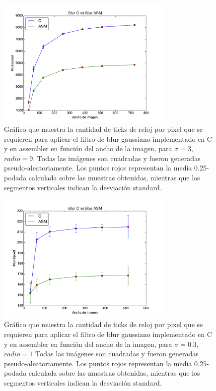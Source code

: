 \begin{figure}[H]
 	\centering
 	\includegraphics[width=0.75\textwidth]{../graficos/blur_v2_lineplot_3-9.pdf}
	\caption{\footnotesize Gráfico que muestra la cantidad de ticks de reloj por pixel que se requieren para aplicar el filtro de blur gaussiano implementado en C y en assembler en función del ancho de la imagen, para $\sigma = 3$, $radio = 9$. Todas las imágenes son cuadradas y fueron generadas pseudo-aleatoriamente. Los puntos rojos representan la media 0.25-podada calculada sobre las muestras obtenidas, mientras que los segmentos verticales indican la desviación standard.}
	\label{fig:exp-blur1}
\end{figure}

\begin{figure}[H]
 	\centering
 	\includegraphics[width=0.75\textwidth]{../graficos/blur_v2_lineplot_03-1.pdf}
	\caption{\footnotesize Gráfico que muestra la cantidad de ticks de reloj por pixel que se requieren para aplicar el filtro de blur gaussiano implementado en C y en assembler en función del ancho de la imagen, para $\sigma = 0.3$, $radio = 1$ Todas las imágenes son cuadradas y fueron generadas pseudo-aleatoriamente. Los puntos rojos representan la media 0.25-podada calculada sobre las muestras obtenidas, mientras que los segmentos verticales indican la desviación standard.}
	\label{fig:exp-blur2}
\end{figure}



